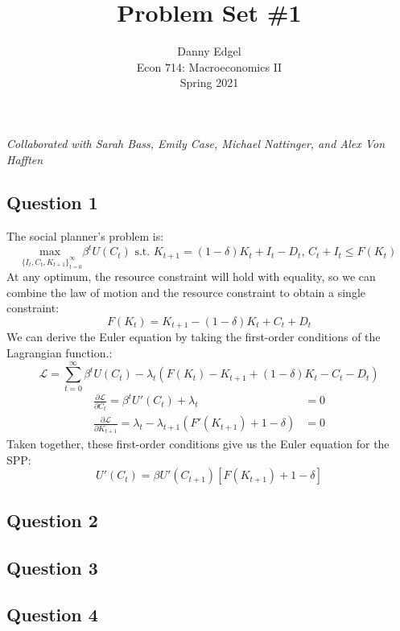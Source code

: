 \documentclass{article}
\newcommand{\usmax}[1]{\underset{#1}{\text{max }}}
\renewcommand{\L}{\mathcal{L}}
\begin{document}
\title{	Problem Set \#1 }
\author{ 	Danny Edgel 					\\ 
			Econ 714: Macroeconomics II		\\
			Spring 2021						\\
		}
\maketitle\thispagestyle{empty}


\noindent\textit{Collaborated with Sarah Bass, Emily Case, Michael Nattinger, and Alex Von Hafften}


\subsection*{Question 1}

The social planner's problem is:
\[
	\usmax{\{I_t,C_t,K_{t+1}\}_{t=0}^\infty}\beta^tU(C_t)\text{ s.t. }K_{t+1} = (1-\delta)K_t + I_t - D_t\text{, } C_t + I_t\leq F(K_t)
\]
At any optimum, the resource constraint will hold with equality, so we can combine the law of motion and the resource constraint to obtain a single constraint:
\[
	F(K_t) = K_{t+1} - (1-\delta)K_t + C_t + D_t 
\]
We can derive the Euler equation by taking the first-order conditions of the Lagrangian function.:
\[
	\L = \sum_{t=0}^\infty \beta^tU(C_t) - \lambda_t\left(F(K_t) - K_{t+1} + (1-\delta)K_t - C_t - D_t \right)
\]
\begin{align*}
	\frac{\partial \L}{\partial C_t} 		= \beta^tU'(C_t)+\lambda_t 										&= 0	\\
	\frac{\partial \L}{\partial K_{t+1}}	= \lambda_t - \lambda_{t+1}\left(F'(K_{t+1}) + 1-\delta\right) 	&= 0	
\end{align*}
Taken together, these first-order conditions give us the Euler equation for the SPP:
\[
	U'(C_t) = \beta U'(C_{t+1})\left[F(K_{t+1})+1-\delta\right]
\]



\subsection*{Question 2}



\subsection*{Question 3}



\subsection*{Question 4}


\end{document}
